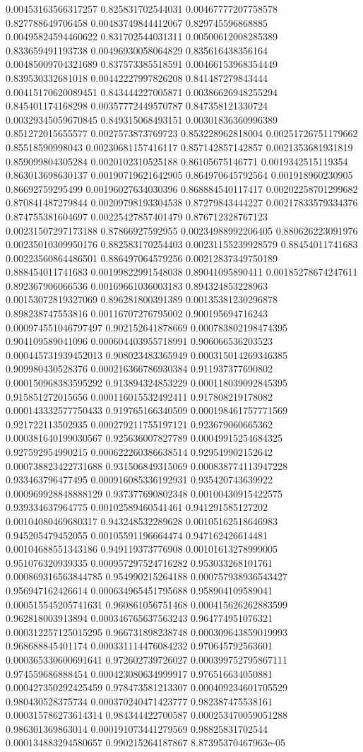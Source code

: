 \begin{table}
\begin{tabu}
\begin{sparkline}{10}
0.00453163566317257 0.825831702544031 0.00467777207758578 0.827788649706458 0.00483749844412067 0.829745596868885 0.00495824594460622 0.831702544031311 0.00500612008285389 0.833659491193738 0.00496930058064829 0.835616438356164 0.00485009704321689 0.837573385518591 0.00466153968354449 0.839530332681018 0.00442227997826208 0.841487279843444 0.00415170620089451 0.843444227005871 0.00386626948255294 0.845401174168298 0.00357772449570787 0.847358121330724 0.00329345059670845 0.849315068493151 0.00301836360996389 0.851272015655577 0.0027573873769723 0.853228962818004 0.00251726751179662 0.85518590998043 0.00230681157416117 0.857142857142857 0.0021353681931819 0.859099804305284 0.0020102310525188 0.86105675146771 0.0019342515119354 0.863013698630137 0.00190719621642905 0.864970645792564 0.001918960230905 0.86692759295499 0.00196027634030396 0.868884540117417 0.00202258701299682 0.870841487279844 0.00209798193304538 0.87279843444227 0.00217833579334376 0.874755381604697 0.00225427857401479 0.876712328767123 0.00231507297173188 0.87866927592955 0.00234988992206405 0.880626223091976 0.00235010309950176 0.882583170254403 0.00231155239928579 0.88454011741683 0.00223560864486501 0.886497064579256 0.00212837349750189 0.888454011741683 0.00199822991548038 0.89041095890411 0.00185278674247611 0.892367906066536 0.00169661036003183 0.894324853228963 0.00153072819327069 0.896281800391389 0.00135381230296878 0.898238747553816 0.00116707276795002 0.900195694716243 0.000974551046797497 0.902152641878669 0.000783802198474395 0.904109589041096 0.000604403955718991 0.906066536203523 0.000445731939452013 0.908023483365949 0.000315014269346385 0.909980430528376 0.000216366786930384 0.911937377690802 0.000150968383595292 0.913894324853229 0.000118039092845395 0.915851272015656 0.000116015532492411 0.917808219178082 0.000143332577750433 0.919765166340509 0.000198461757771569 0.921722113502935 0.000279211755197121 0.923679060665362 0.000381640199030567 0.925636007827789 0.00049915254684325 0.927592954990215 0.000622260386638514 0.929549902152642 0.000738823422731688 0.931506849315069 0.000838774113947228 0.933463796477495 0.000916085336192931 0.935420743639922 0.000969928848888129 0.937377690802348 0.00100430915422575 0.939334637964775 0.00102589460541461 0.941291585127202 0.00104080469680317 0.943248532289628 0.00105162518646983 0.945205479452055 0.00105591196664474 0.947162426614481 0.00104688551343186 0.949119373776908 0.00101613278999005 0.951076320939335 0.000957297524716282 0.953033268101761 0.000869316563844785 0.954990215264188 0.000757938936543427 0.956947162426614 0.000634965451795688 0.958904109589041 0.000515545205741631 0.960861056751468 0.000415626262883599 0.962818003913894 0.000346765637563243 0.964774951076321 0.000312257125015295 0.966731898238748 0.000309643859019993 0.968688845401174 0.000331114476084232 0.970645792563601 0.000365330600691641 0.972602739726027 0.000399752795867111 0.974559686888454 0.000423080634999917 0.976516634050881 0.000427350292425459 0.978473581213307 0.000409234601705529 0.980430528375734 0.000370240471423777 0.982387475538161 0.000315786273614314 0.984344422700587 0.000253470059051288 0.986301369863014 0.000191073441279569 0.98825831702544 0.000134883294580657 0.990215264187867 8.87395370467963e-05 
\end{sparkline}
\end{tabu}
\end{table}
